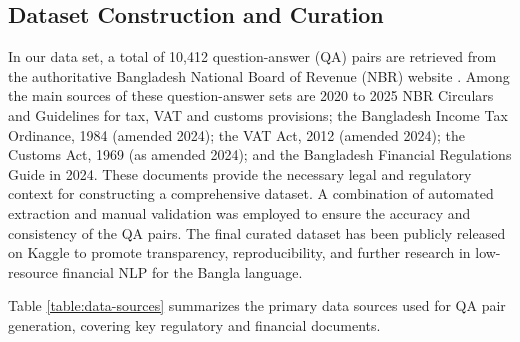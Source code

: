 \documentclass{article}
\begin{document}
\subsection{Dataset Construction and Curation}

In our data set, a total of 10,412 question-answer (QA) pairs are retrieved from the
authoritative Bangladesh National Board of Revenue (NBR) website \cite{NBR}. Among the
main sources of these question-answer sets are 2020 to 2025 NBR Circulars and
Guidelines for tax, VAT and customs provisions; the Bangladesh Income Tax Ordinance,
1984 (amended 2024); the VAT Act, 2012 (amended 2024); the Customs Act, 1969 (as
amended 2024); and the Bangladesh Financial Regulations Guide in 2024. These documents
provide the necessary legal and regulatory context for constructing a comprehensive
dataset. A combination of automated extraction and manual validation was employed to
ensure the accuracy and consistency of the QA pairs. The final curated dataset has been
publicly released on Kaggle \cite{banglafingpt2026} to promote transparency,
reproducibility, and further research in low-resource financial NLP for the Bangla
language.

Table \ref{table:data-sources} summarizes the primary data sources used for QA pair
generation, covering key regulatory and financial documents.

\begin{table}[!h]
\caption{Data sources for QA pair generation}
\centering
{}
\label{table:data-sources}
\end{table}
\end{document}
